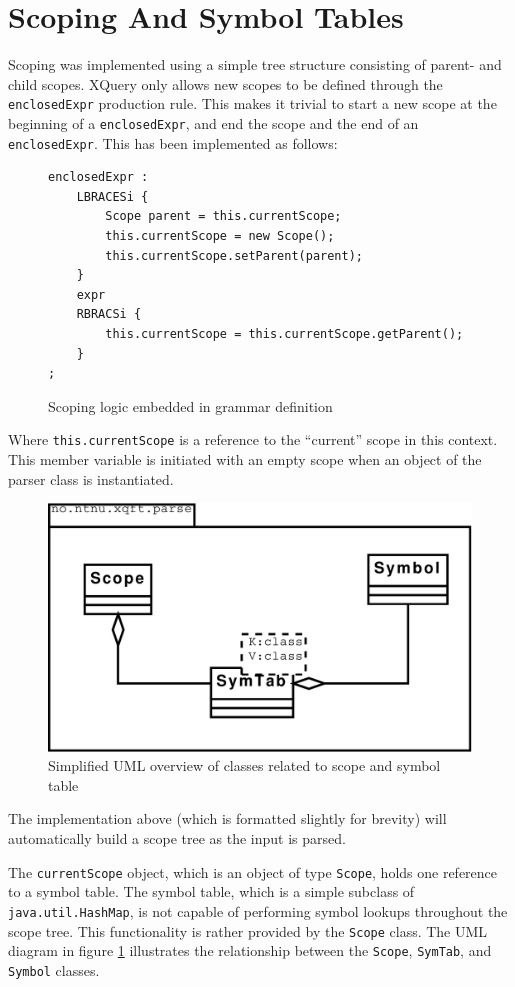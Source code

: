 \section{Scoping And Symbol Tables}
\label{sect:impl:scoping_and_symtab}
Scoping was implemented using a simple tree structure consisting of parent- and
child scopes. XQuery only allows new scopes to be defined through the
\verb!enclosedExpr! production rule. This makes it trivial to start a new scope at the
beginning of a \verb!enclosedExpr!, and end the scope and the end of an \verb!enclosedExpr!.
This has been implemented as follows:
\begin{figure}[h!]
\begin{Verbatim}
enclosedExpr : 
    LBRACESi {
        Scope parent = this.currentScope; 
        this.currentScope = new Scope(); 
        this.currentScope.setParent(parent); 
    }
    expr 
    RBRACSi { 
        this.currentScope = this.currentScope.getParent(); 
    }
;
\end{Verbatim}
\caption{Scoping logic embedded in grammar definition}
\end{figure}

Where \verb!this.currentScope! is a reference to the ``current'' scope in this
context. This member variable is initiated with an empty scope when an object
of the parser class is instantiated.
\begin{figure}[h!]
  \centering
    \includegraphics[scale=0.4]{diagrams/uml}
  \caption[Scope and symtab UML diagram]{Simplified UML overview of classes related to
  scope and symbol table}
  \label{fig:scope:uml1}
\end{figure}

The implementation above (which is formatted slightly for brevity) will
automatically build a scope tree as the input is parsed.

The \verb!currentScope! object, which is an object of type \verb!Scope!, holds one reference
to a symbol table. The symbol table, which is a simple subclass of
\verb!java.util.HashMap!, is not capable of performing symbol lookups throughout the
scope tree. This functionality is rather provided by the \verb!Scope! class. The UML diagram
in figure \ref{fig:scope:uml1} illustrates the relationship between the
\verb!Scope!, \verb!SymTab!, and \verb!Symbol! classes.

